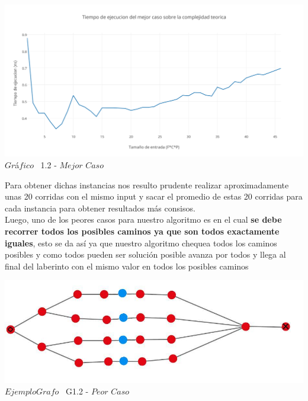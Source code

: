 \vspace*{0.3cm} \vspace*{0.3cm}
  \begin{center}
 \includegraphics[scale=0.5]{./EJ1/mejorcaso1.png}
 {$Gr$\'a$fico$ \ 1.2 - $Mejor$ $Caso$}
  \end{center}
  \vspace*{0.3cm}

 Para obtener dichas instancias nos resulto prudente realizar aproximadamente unas 20 corridas con el mismo input y sacar el promedio de estas 20 corridas para cada instancia para obtener resultados m\'as consisos.\\ 



Luego, uno de los peores casos para nuestro algoritmo es en el cual  \textbf{se debe recorrer todos los posibles caminos ya que son todos exactamente iguales}, esto se da as\'i ya que nuestro algoritmo chequea todos los caminos posibles y como todos pueden ser soluci\'on posible avanza por todos y llega al final del laberinto con el mismo valor en todos los posibles caminos\\

\vspace*{0.3cm} \vspace*{0.3cm}
  \begin{center}
\includegraphics[scale=0.65]{./EJ1/ej1grafopeorcaso.jpeg}
{$Ejemplo Grafo$ \ G1.2 - $Peor$ $Caso$}
  \end{center}
  \vspace*{0.3cm}

